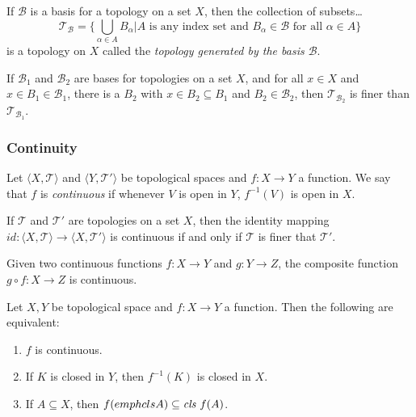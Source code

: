 \begin{proposition}
If $\mathcal{B}$ is a basis for a topology on a set $X$, then the collection of subsets\dots
$$\mathcal{T}_{\mathcal{B}} = \{\bigcup_{\alpha \in A} B_{\alpha} | A \textrm{ is any index set and }B_{\alpha} \in \mathcal{B} \textrm{ for all } \alpha \in A \}$$
is a topology on $X$ called the \emph{topology generated by the basis $\mathcal{B}$}.
\end{proposition}

\begin{proposition}
If $\mathcal{B}_1$ and $\mathcal{B}_2$ are bases for topologies on a set $X$, and for all $x \in X$ and $x \in B_1 \in \mathcal{B}_1$, there is a $B_2$ with $x \in B_2 \subseteq B_1$
and $B_2 \in \mathcal{B}_2$, then $\mathcal{T}_{\mathcal{B}_2}$ is finer than $\mathcal{T}_{\mathcal{B}_1}$.
\end{proposition}

\subsubsection{Continuity}\label{topologicalcontinuity}
Let $\langle X,\mathcal{T} \rangle$ and $\langle Y,\mathcal{T}' \rangle$ be topological spaces and $f:X \rightarrow Y$ a function. We say that $f$ is \emph{continuous} if whenever $V$ is
open in $Y$, $f^{-1}(V)$ is open in $X$.

\begin{proposition}
If $\mathcal{T}$ and $\mathcal{T}'$ are topologies on a set $X$, then the identity mapping $id:\langle X,\mathcal{T} \rangle \rightarrow \langle X,\mathcal{T}' \rangle$ is
continuous if and only if $\mathcal{T}$ is finer that $\mathcal{T}'$.
\end{proposition}

\begin{theorem}
Given two continuous functions $f : X \rightarrow Y$ and $g : Y \rightarrow Z$, the composite function $g \circ f : X \rightarrow Z$ is continuous.
\end{theorem}

\begin{theorem}
Let $X, Y$ be topological space and $f : X \rightarrow Y$ a function. Then the following are equivalent:
\begin{enumerate}
  \item $f$ is continuous.
  \item If $K$ is closed in $Y$, then $f^{-1}(K)$ is closed in $X$.
  \item If $A \subseteq X$, then $f(emph{cls }A) \subseteq \emph{cls }f(A)$.
\end{enumerate}
\end{theorem}

